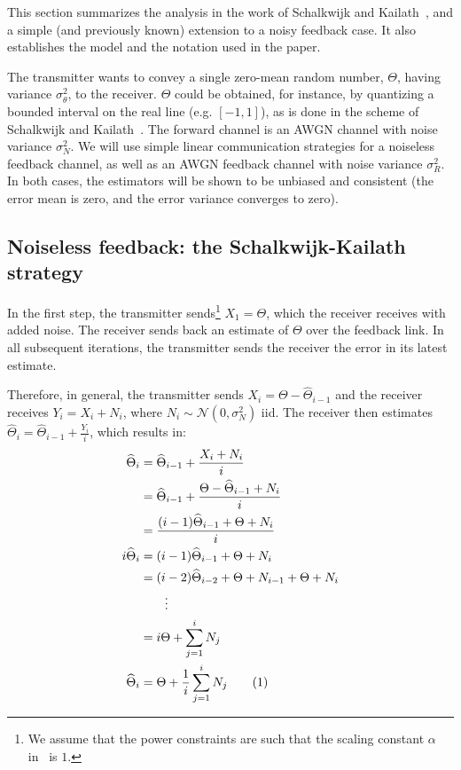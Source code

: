 \documentclass[letterpaper, 10pt, conference]{ieeeconf}
\newcommand\numberthis{\stepcounter{equation}\tag{\theequation}}
\begin{document}
This section summarizes the analysis in the work of Schalkwijk and Kailath~\cite{S&K}, and a simple (and previously known) extension to a noisy feedback case. It also establishes the model and the notation used in the paper.

The transmitter wants to convey a single zero-mean random number, $\Theta$, having variance
$\sigma_\theta^2$, to the receiver. $\Theta$ could be obtained, for instance, by quantizing a bounded interval on the real line (e.g. $[-1,1]$), as is done in the scheme of Schalkwijk and Kailath~\cite{S&K}. The forward channel is an AWGN channel with noise variance $\sigma_N^2$. We will use simple linear communication strategies for a noiseless feedback channel, as well as an AWGN feedback channel with noise variance $\sigma_R^2$. In both cases, the estimators will be shown to be unbiased and consistent (the error mean is zero, and the error variance converges to zero).


\subsection{Noiseless feedback: the Schalkwijk-Kailath strategy}
\label{sec:sk-noiseless}

 In the first step, the transmitter sends\footnote{We assume that the power constraints are such that the scaling constant $\alpha$ in~\cite{S&K} is $1$.} $X_1 = \Theta$, which the receiver receives with added noise. The receiver sends back an estimate of $\Theta$ over the feedback link. In all subsequent iterations, the transmitter sends the receiver the error in its latest estimate.

Therefore, in general, the transmitter sends $X_i = \Theta - \widehat\Theta_{i-1}$ and the receiver receives $Y_i = X_i + N_i$, where $N_i \sim \mathcal{N}(0, \sigma_N^2)$ iid. The receiver then estimates $\widehat\Theta_i = \widehat\Theta_{i-1} + \frac{Y_i}{i}$, which results in:
\begin{align*}
	\widehat{\Theta}_{i}  &= \widehat{\Theta}_{i-1}+\frac{X_{i}+N_{i}}{i} \\
					  &= \widehat{\Theta}_{i-1}+\frac{\Theta-\widehat{\Theta}_{i-1}+N_{i}}{i} \\
					  &= \frac{(i-1)\widehat{\Theta}_{i-1}+\Theta+N_{i}}{i} \\
	i\widehat{\Theta}_{i} &= (i-1)\widehat{\Theta}_{i-1}+\Theta+N_{i} \\
					  &=(i-2)\widehat{\Theta}_{i-2}+\Theta+N_{i-1}+\Theta+N_{i} \\
					  & \qquad \vdots \\
					  &= i\Theta+\sum_{j=1}^{i}N_{j} \\
	\widehat{\Theta}_{i}  &=\Theta+\frac{1}{i}\sum_{j=1}^{i}N_{j} \numberthis \label{eq:theta_hat_i-noiseless}
\end{align*}
\end{document}
